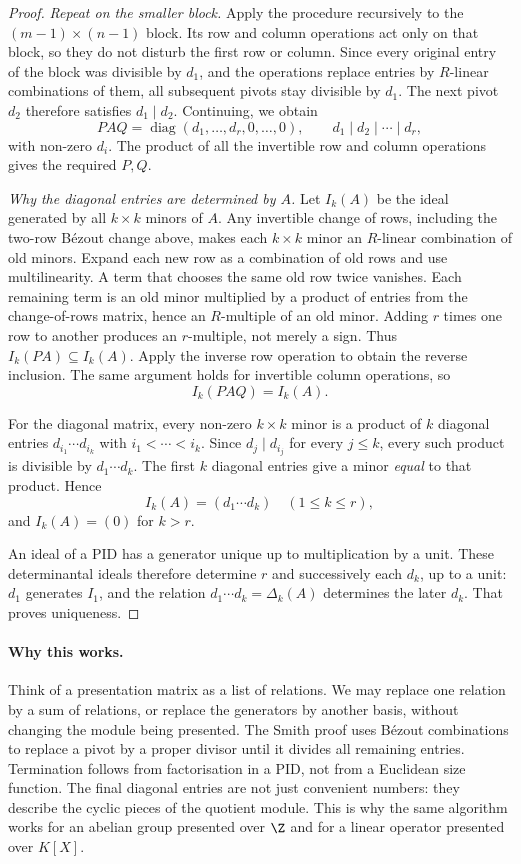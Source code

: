 \begin{proof}
\emph{Repeat on the smaller block.}
Apply the procedure recursively to the $(m-1)\times(n-1)$ block. Its row and column operations act only on that block, so they do not disturb the first row or column. Since every original entry of the block was divisible by $d_1$, and the operations replace entries by $R$-linear combinations of them, all subsequent pivots stay divisible by $d_1$. The next pivot $d_2$ therefore satisfies $d_1\mid d_2$. Continuing, we obtain
\[
PAQ=\operatorname{diag}(d_1,\ldots,d_r,0,\ldots,0),
\qquad d_1\mid d_2\mid\cdots\mid d_r,
\]
with non-zero $d_i$. The product of all the invertible row and column operations gives the required $P,Q$.

\emph{Why the diagonal entries are determined by $A$.}
Let $I_k(A)$ be the ideal generated by all $k\times k$ minors of $A$. Any invertible change of rows, including the two-row Bézout change above, makes each $k\times k$ minor an $R$-linear combination of old minors. Expand each new row as a combination of old rows and use multilinearity. A term that chooses the same old row twice vanishes. Each remaining term is an old minor multiplied by a product of entries from the change-of-rows matrix, hence an $R$-multiple of an old minor. Adding $r$ times one row to another produces an $r$-multiple, not merely a sign. Thus $I_k(PA)\subseteq I_k(A)$. Apply the inverse row operation to obtain the reverse inclusion. The same argument holds for invertible column operations, so
\[
I_k(PAQ)=I_k(A).
\]

For the diagonal matrix, every non-zero $k\times k$ minor is a product of $k$ diagonal entries $d_{i_1}\cdots d_{i_k}$ with $i_1<\cdots<i_k$. Since $d_j\mid d_{i_j}$ for every $j\le k$, every such product is divisible by $d_1\cdots d_k$. The first $k$ diagonal entries give a minor \emph{equal} to that product. Hence
\[
I_k(A)=(d_1\cdots d_k)\quad(1\le k\le r),
\]
and $I_k(A)=(0)$ for $k>r$.

An ideal of a PID has a generator unique up to multiplication by a unit. These determinantal ideals therefore determine $r$ and successively each $d_k$, up to a unit: $d_1$ generates $I_1$, and the relation $d_1\cdots d_k=\Delta_k(A)$ determines the later $d_k$. That proves uniqueness.
\end{proof}

\paragraph{Why this works.}
Think of a presentation matrix as a list of relations. We may replace one relation by a sum of relations, or replace the generators by another basis, without changing the module being presented. The Smith proof uses Bézout combinations to replace a pivot by a proper divisor until it divides all remaining entries. Termination follows from factorisation in a PID, not from a Euclidean size function. The final diagonal entries are not just convenient numbers: they describe the cyclic pieces of the quotient module. This is why the same algorithm works for an abelian group presented over $\Z$ and for a linear operator presented over $K[X]$.

